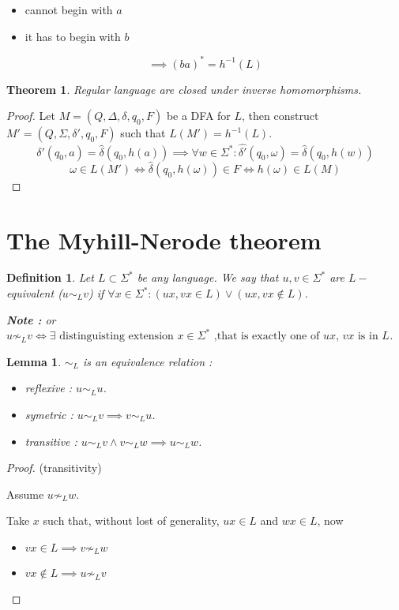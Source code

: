 \documentclass[a4paper,11pt]{article}
\newtheorem{mydef}{Definition}
\newtheorem{thm}{Theorem}[section]
\newtheorem{lemma}{Lemma}[section]
\begin{document}
\begin{itemize}
\item cannot begin with $a$
\item it has to begin with $b$
\end{itemize}
\[
  \implies (ba)^* = h^{-1}(L)
\]

\begin{thm}
  Regular language are closed under inverse homomorphisms.
\end{thm}

\begin{proof}
  Let $M = (Q,\Delta,\delta,q_0,F)$ be a DFA for $L$, then construct $M' =
  (Q,\Sigma,\delta',q_0,F)$ such that $L(M') = h^{-1}(L)$.
  \[
    \delta'(q_0,a) = \widehat{\delta}(q_0,h(a)) \implies \forall w \in \Sigma^*
    : \widehat{\delta'}(q_0,\omega) = \widehat{\delta}(q_0,h(w))
  \]
  \[
    \omega \in L(M') \iff \widehat{\delta}(q_0,h(\omega)) \in F \iff h(\omega)
    \in L(M)
  \]
\end{proof}

\section{The Myhill-Nerode theorem}

\begin{mydef}
  Let $L \subset \Sigma^*$ be any language. We say that $u,v \in \Sigma^*$ are
  $L-$equivalent ($u \sim_L v$) if $\forall x \in \Sigma^* : (ux,vx \in L) \vee
  (ux,vx \not \in L)$.

  \textbf{Note : } or $u \not \sim_L v \iff \exists \text{ distinguisting
    extension } x \in \Sigma^* \text{ ,that is exactly one of $ux$, $vx$ is in $L$}$.
\end{mydef}

\begin{lemma}
  $\sim_L$ is an equivalence relation :
  \begin{itemize}
  \item reflexive : $u \sim_L u$.
  \item symetric : $u \sim_L v \implies v \sim_L u$.
  \item transitive : $u \sim_L v \wedge v \sim_L w \implies u \sim_L w$.
  \end{itemize}
\end{lemma}

\begin{proof}(transitivity)
  
  Assume $u \not \sim_L w$.

  Take $x$ such that, without lost of generality, $ux \in L$ and $wx \in L$, now
  \begin{itemize}
  \item $vx \in L \implies v \not \sim_L w$
  \item $vx \not \in L \implies u \not \sim_L v$
  \end{itemize}
\end{proof}
\end{document}
